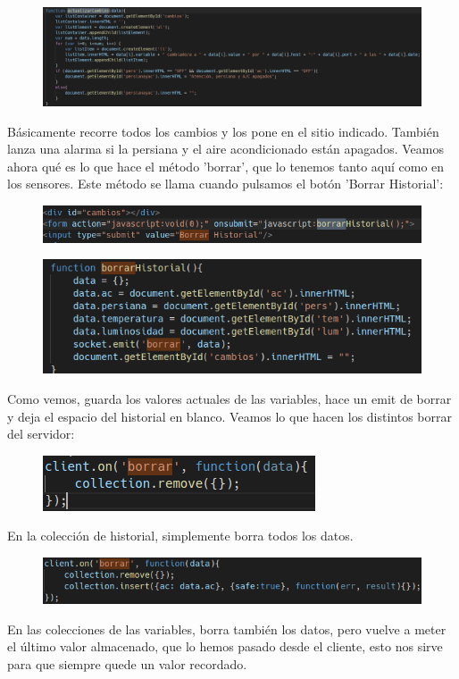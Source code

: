 \documentclass{article}
\begin{document}
	\begin{figure}[H]
		\centering
		\includegraphics[totalheight=3.2cm]{img/20.png}
	\end{figure}
	Básicamente recorre todos los cambios y los pone en el sitio indicado. También lanza una alarma si la persiana y el aire acondicionado están apagados. Veamos ahora qué es lo que hace el método 'borrar', que lo tenemos tanto aquí como en los sensores. Este método se llama cuando pulsamos el botón 'Borrar Historial':
	\begin{figure}[H]
		\centering
		\includegraphics[totalheight=1.2cm]{img/21.png}
	\end{figure}
	\begin{figure}[H]
		\centering
		\includegraphics[totalheight=3.7cm]{img/22.png}
	\end{figure}
	Como vemos, guarda los valores actuales de las variables, hace un emit de borrar y deja el espacio del historial en blanco. Veamos lo que hacen los distintos borrar del servidor:
	\begin{figure}[H]
		\centering
		\includegraphics[totalheight=2.5cm]{img/23.png}
	\end{figure}
	En la colección de historial, simplemente borra todos los datos.
	\begin{figure}[H]
		\centering
		\includegraphics[totalheight=1.5cm]{img/24.png}
	\end{figure}
	En las colecciones de las variables, borra también los datos, pero vuelve a meter el último valor almacenado, que lo hemos pasado desde el cliente, esto nos sirve para que siempre quede un valor recordado.
	
\end{document}
